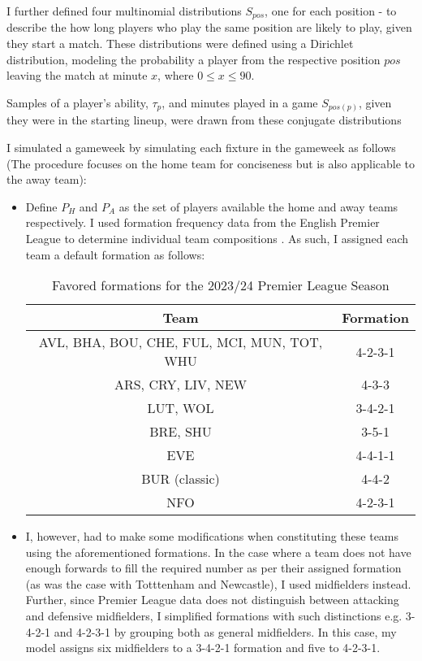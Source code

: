I further defined four multinomial distributions $S_{pos}$, one for each position - to describe the how long players who play the same position are likely to play, given they start a match. These distributions were defined using a Dirichlet distribution, modeling the probability a player from the respective position $pos$ leaving the match at minute $x$, where $0 \le x \le 90$. 

Samples of a player's ability, $\tau_p$, and minutes played in a game $S_{pos(p)}$, given they were in the starting lineup, were drawn from these conjugate distributions

I simulated a gameweek by simulating each fixture in the gameweek as follows (The procedure focuses on the home team for conciseness but is also applicable to the away team):
\begin{itemize}
    \item Define $P_H$ and $P_A$ as the set of players available the home and away teams respectively. I used formation frequency data from the English Premier League to determine individual team compositions \cite{clarke2024}. As such, I assigned each team a default formation as follows:
    \begin{table}[h!]
        \centering
        \begin{tabular}{|c|c|}
            \hline
            Team & Formation \\ \hline
            AVL, BHA, BOU, CHE, FUL, MCI, MUN, TOT, WHU & 4-2-3-1    \\ \hline
            ARS, CRY, LIV, NEW & 4-3-3  \\ \hline
            LUT, WOL & 3-4-2-1 \\ \hline
            BRE, SHU & 3-5-1 \\ \hline
            EVE & 4-4-1-1 \\ \hline
            BUR (classic) & 4-4-2 \\ \hline
            NFO & 4-2-3-1 \\ \hline
        \end{tabular}
        \caption{Favored formations for the 2023/24 Premier League Season}
        \label{tab:fomation_table}
    \end{table}
    \item I, however, had to make some modifications when constituting these teams using the aforementioned formations. In the case where a team does not have enough forwards to fill the required number as per their assigned formation (as was the case with Totttenham and Newcastle), I used midfielders instead. Further, since Premier League data does not distinguish between attacking and defensive midfielders, I simplified formations with such distinctions e.g. 3-4-2-1 and 4-2-3-1 by grouping both as general midfielders. In this case, my model assigns six midfielders to a 3-4-2-1 formation and five to 4-2-3-1.

\end{itemize}
